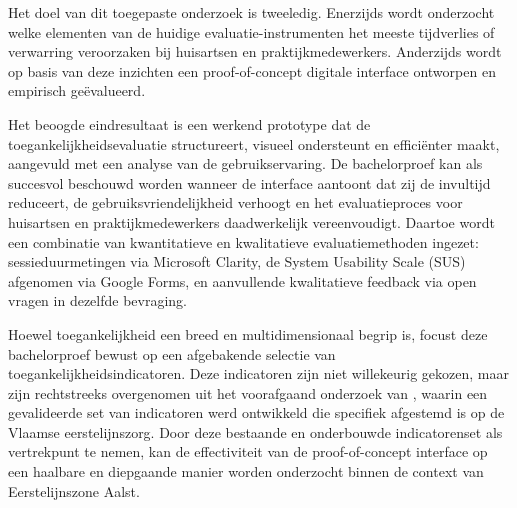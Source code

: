 
Het doel van dit toegepaste onderzoek is tweeledig. Enerzijds wordt onderzocht welke elementen
van de huidige evaluatie-instrumenten het meeste tijdverlies of verwarring
veroorzaken bij huisartsen en praktijkmedewerkers. Anderzijds wordt op basis van deze inzichten
een proof-of-concept digitale interface ontworpen en empirisch geëvalueerd.
\medskip

Het beoogde eindresultaat is een werkend prototype dat de toegankelijkheidsevaluatie structureert,
visueel ondersteunt en efficiënter maakt, aangevuld met een analyse van de gebruikservaring. De
bachelorproef kan als succesvol beschouwd worden wanneer de interface aantoont dat zij de invultijd
reduceert, de gebruiksvriendelijkheid verhoogt en het evaluatieproces voor huisartsen en
praktijkmedewerkers daadwerkelijk vereenvoudigt. Daartoe wordt een combinatie van kwantitatieve
en kwalitatieve evaluatiemethoden ingezet: sessieduurmetingen via Microsoft Clarity, de System Usability Scale (SUS) afgenomen via
Google Forms, en aanvullende kwalitatieve feedback via open vragen in dezelfde bevraging.
\medskip

Hoewel toegankelijkheid een breed en multidimensionaal begrip is, focust deze bachelorproef
bewust op een afgebakende selectie van toegankelijkheidsindicatoren. Deze indicatoren zijn
niet willekeurig gekozen, maar zijn rechtstreeks overgenomen uit het voorafgaand onderzoek
van \textcite{Merckx2023}, waarin een gevalideerde set van indicatoren werd ontwikkeld die
specifiek afgestemd is op de Vlaamse eerstelijnszorg. Door deze bestaande en onderbouwde
indicatorenset als vertrekpunt te nemen, kan de effectiviteit van de proof-of-concept
interface op een haalbare en diepgaande manier worden onderzocht binnen de context van
Eerstelijnszone Aalst.

\section{}%
\label{sec:opzet-bachelorproef}


